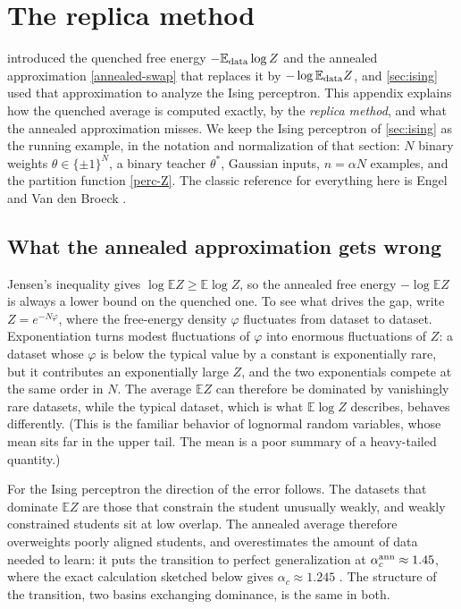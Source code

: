 \documentclass[11pt]{article}
\newcommand{\E}{\mathbb{E}}
\begin{document}
\section{The replica method}
\label{app:replica}

 introduced the quenched free energy $-\E_{\rm data}\log Z$ and the annealed approximation \eqref{annealed-swap} that replaces it by $-\log\E_{\rm data}Z$, and \cref{sec:ising} used that approximation to analyze the Ising perceptron. This appendix explains how the quenched average is computed exactly, by the \emph{replica method}, and what the annealed approximation misses. We keep the Ising perceptron of \cref{sec:ising} as the running example, in the notation and normalization of that section: $N$ binary weights $\theta\in\{\pm1\}^N$, a binary teacher $\theta^*$, Gaussian inputs, $n=\alpha N$ examples, and the partition function \eqref{perc-Z}. The classic reference for everything here is Engel and Van den Broeck \cite{engel2001statistical}.

\subsection{What the annealed approximation gets wrong}
\label{app:annealed-correction}

Jensen's inequality gives $\log\E Z\geq\E\log Z$, so the annealed free energy $-\log\E Z$ is always a lower bound on the quenched one. To see what drives the gap, write $Z = e^{-N\varphi}$, where the free-energy density $\varphi$ fluctuates from dataset to dataset. Exponentiation turns modest fluctuations of $\varphi$ into enormous fluctuations of $Z$: a dataset whose $\varphi$ is below the typical value by a constant is exponentially rare, but it contributes an exponentially large $Z$, and the two exponentials compete at the same order in $N$. The average $\E Z$ can therefore be dominated by vanishingly rare datasets, while the typical dataset, which is what $\E\log Z$ describes, behaves differently. (This is the familiar behavior of lognormal random variables, whose mean sits far in the upper tail. The mean is a poor summary of a heavy-tailed quantity.)

For the Ising perceptron the direction of the error follows. The datasets that dominate $\E Z$ are those that constrain the student unusually weakly, and weakly constrained students sit at low overlap. The annealed average therefore overweights poorly aligned students, and overestimates the amount of data needed to learn: it puts the transition to perfect generalization at $\alpha_c^{\rm ann}\approx1.45$, where the exact calculation sketched below gives $\alpha_c\approx1.245$ \cite{gyorgyi1990first}. The structure of the transition, two basins exchanging dominance, is the same in both.
\end{document}
